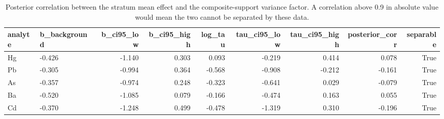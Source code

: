 \begin{table}[htbp]
\centering
\caption{Posterior correlation between the stratum mean effect and the composite-support variance factor. A correlation above 0.9 in absolute value would mean the two cannot be separated by these data.}
\label{tab:alias}
\footnotesize
\begin{tabular}{llrrrrrrr}
\toprule
analyte & b\_background & b\_ci95\_low & b\_ci95\_high & log\_tau & tau\_ci95\_low & tau\_ci95\_high & posterior\_corr & separable \\
\midrule
Hg & -0.426 & -1.140 & 0.303 & 0.093 & -0.219 & 0.414 & 0.078 & True \\
Pb & -0.305 & -0.994 & 0.364 & -0.568 & -0.908 & -0.212 & -0.161 & True \\
As & -0.357 & -0.974 & 0.248 & -0.323 & -0.641 & 0.029 & -0.079 & True \\
Ba & -0.520 & -1.085 & 0.079 & -0.166 & -0.474 & 0.163 & 0.055 & True \\
Cd & -0.370 & -1.248 & 0.499 & -0.478 & -1.319 & 0.310 & -0.196 & True \\
\bottomrule
\end{tabular}
\end{table}
